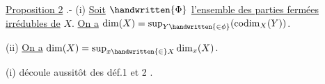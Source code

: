 \uline{Proposition 2} .- (i) \uline{Soit} $\handwritten{\Phi}$ \uline{l'ensemble des parties fermées irrédubles de} $X$. \uline{On a} $\dim(X)=\sup_{Y\handwritten{\in\phi}}(\operatorname{codim}_X(Y))$.

(ii) \uline{On a} $\dim(X)=\sup_{x\handwritten{\in}X}\dim_x(X)$.

(i) découle aussitôt des déf.1 et 2 . 
